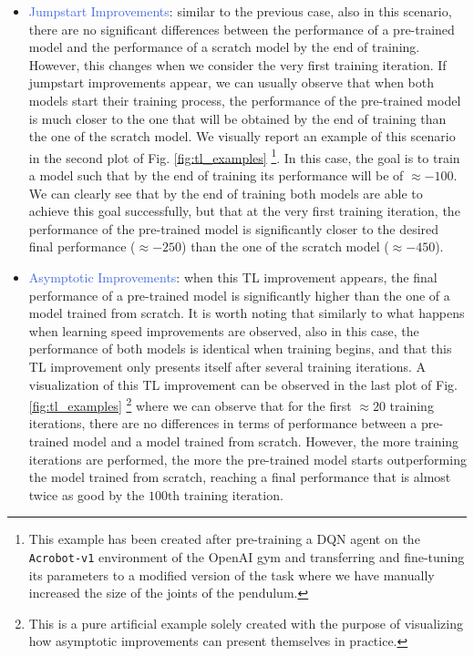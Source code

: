 \begin{itemize}
	\item \textcolor{RoyalBlue}{Jumpstart Improvements}: similar to the previous case, also in this scenario, there are no significant differences between the performance of a pre-trained model and the performance of a scratch model by the end of training. However, this changes when we consider the very first training iteration. If jumpstart improvements appear, we can usually observe that when both models start their training process, the performance of the pre-trained model is much closer to the one that will be obtained by the end of training than the one of the scratch model. We visually report an example of this scenario in the second plot of Fig. \ref{fig:tl_examples} \footnote{This example has been created after pre-training a DQN agent \cite{mnih2015human} on the \texttt{Acrobot-v1} environment of the OpenAI gym \cite{brockman2016openai} and transferring and fine-tuning its parameters to a modified version of the task where we have manually increased the size of the joints of the pendulum.}. In this case, the goal is to train a model such that by the end of training its performance will be of $\approx -100$. We can clearly see that by the end of training both models are able to achieve this goal successfully, but that at the very first training iteration, the performance of the pre-trained model is significantly closer to the desired final performance ($\approx -250$) than the one of the scratch model ($\approx -450$). 
	\item \textcolor{RoyalBlue}{Asymptotic Improvements}: when this TL improvement appears, the final performance of a pre-trained model is significantly higher than the one of a model trained from scratch. It is worth noting that similarly to what happens when learning speed improvements are observed, also in this case, the performance of both models is identical when training begins, and that this TL improvement only presents itself after several training iterations. A visualization of this TL improvement can be observed in the last plot of Fig. \ref{fig:tl_examples} \footnote{This is a pure artificial example solely created with the purpose of visualizing how asymptotic improvements can present themselves in practice.} where we can observe that for the first $\approx 20$ training iterations, there are no differences in terms of performance between a pre-trained model and a model trained from scratch. However, the more training iterations are performed, the more the pre-trained model starts outperforming the model trained from scratch, reaching a final performance that is almost twice as good by the $100\text{th}$ training iteration.
\end{itemize}

